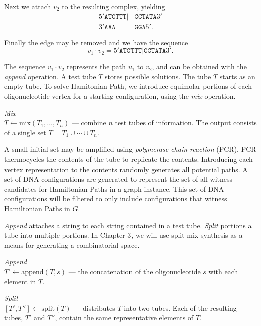 \noindent Next we attach $v_2$ to the resulting complex, yielding
\begin{align*}
 5'\texttt{ATCTTT}|&\texttt{CCTATA}3'\\
  3'\texttt{AAA}&\texttt{GGA}5'.
\end{align*}

\noindent Finally the edge may be removed and we have the sequence
\[
v_1 \cdot v_2 = 5'\texttt{ATCTTT}|\texttt{CCTATA}3'.
\]

The sequence $v_1 \cdot v_2$ represents the path $v_1$ to $v_2$, and can be obtained with the \textit{append} operation.  A test tube $T$ stores possible solutions.  The tube $T$ starts as an empty tube.  To solve {\sc Hamitonian Path}, we introduce equimolar portions of each oligonucleotide vertex for a starting configuration, using the \textit{mix} operation.

\begin{definition}
\textit{Mix}\\
$ T \leftarrow \text{mix}( T_1, \ldots , T_n)$ --- combine $n$ test tubes of information.  The output consists of a single set $T = T_1 \cup \cdots \cup T_n$.
\end{definition}

A small initial set may be amplified using \textit{polymerase chain reaction} (PCR).  PCR thermocycles the contents of the tube to replicate the contents.  Introducing each vertex representation to the contents randomly generates all potential paths.  A set of DNA configurations are generated to represent the set of all witness candidates for Hamiltonian Paths in a graph instance.  This set of DNA configurations will be filtered to only include configurations that witness Hamiltonian Paths in $G$.

\textit{Append} attaches a string to each string contained in a test tube.  \textit{Split} portions a tube into multiple portions.  In Chapter 3, we will use split-mix synthesis as a means for generating a combinatorial space.

\begin{definition}
\textit{Append}\\
$T' \leftarrow \text{append}( T, s)$ --- the concatenation of the oligonucleotide $s$ with each element in $T$.  
\end{definition}

\begin{definition}
\textit{Split}\\
$[T', T''] \leftarrow \text{split}( T)$ --- distributes $T$ into two tubes.  Each of the resulting tubes, $T'$ and $T''$,  contain the same representative elements of $T$.
\end{definition}

